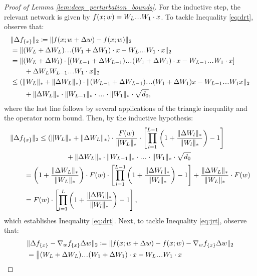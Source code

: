 \begin{refsection}
\begin{proof}[Proof of Lemma \ref{lem:deep_perturbation_bounds}]
For the inductive step, the relevant network is given by $f(x;w) = W_L\mydots W_1\cdot x$. To tackle Inequality \ref{eq:drt}, observe that:
\begin{align*}
    &\norm{\Delta f_{\{x\}}}_2 \coloneqq \norm{f(x;w+\Delta w) - f(x;w)}_2\\
    & = \norm{(W_L+\Delta W_L) \mydots (W_1+\Delta W_1)\cdot x - W_L \mydots W_1\cdot x}_2\\
    & = \|(W_L+\Delta W_l)\cdot  \left[(W_{L-1}+\Delta W_{L-1}) \mydots (W_1+\Delta W_1)\cdot x - W_{L-1} \mydots W_1\cdot x\right] \\
    & \qquad + \Delta W_L W_{L-1} \mydots W_1\cdot x \|_2 \\
    &\leq (\norm{W_L}_* + \norm{\Delta W_L}_*)\cdot\norm{(W_{L-1}+\Delta W_{L-1}) \mydots (W_1+\Delta W_1) x - W_{L-1} \mydots W_1x}_2 \\
    & \qquad + \norm{\Delta W_L}_*\cdot \norm{W_{L-1}}_* \cdot\mydots\cdot \norm{W_1}_*\cdot\sqrt{d_0},
\end{align*}
where the last line follows by several applications of the triangle inequality and the operator norm bound. Then, by the inductive hypothesis:
\begin{align*}
    &\norm{\Delta f_{\{x\}}}_2 \leq  (\norm{W_L}_* + \norm{\Delta W_L}_*) \cdot \frac{F(w)}{\norm{W_L}_*} \cdot \left[ \prod_{l=1}^{L-1} \left( 1 + \frac{\Vert \Delta W_l \Vert_{*}}{\Vert W_l \Vert_{*}}\right)  - 1 \right]\\
    &\qquad\qquad\qquad\qquad+ \norm{\Delta W_L}_* \cdot \norm{W_{L-1}}_* \cdot\mydots\cdot \norm{W_1}_*\cdot \sqrt{d_0} \\
    &\qquad= \left(1 + \frac{\norm{\Delta W_L}_*}{\norm{W_L}_*}\right) \cdot F(w) \cdot \left[ \prod_{l=1}^{L-1} \left( 1 + \frac{\Vert \Delta W_l \Vert_{*}}{\Vert W_l \Vert_{*}}\right)  - 1 \right]+ \frac{\norm{\Delta W_L}_*}{\norm{W_L}_*}\cdot F(w)\\
    &\qquad= F(w)\cdot \left[ \prod_{l=1}^{L} \left( 1 + \frac{\Vert \Delta W_l \Vert_{*}}{\Vert W_l \Vert_{*}}\right)  - 1 \right],
\end{align*}
which establishes Inequality \ref{eq:drt}. Next, to tackle Inequality \ref{eq:jrt}, observe that:
\begin{align*}
    &\norm{\Delta f_{\{x\}} - \nabla_w f_{\{x\}}\Delta w}_2 \coloneqq \norm{f(x;w+\Delta w) - f(x;w)-\nabla_w f_{\{x\}}\Delta w}_2\\
    & = \big\|(W_L+\Delta W_L) \mydots (W_1+\Delta W_1)\cdot x - W_L \mydots W_1\cdot x \\

\end{align*}
\end{proof}
\end{refsection}
